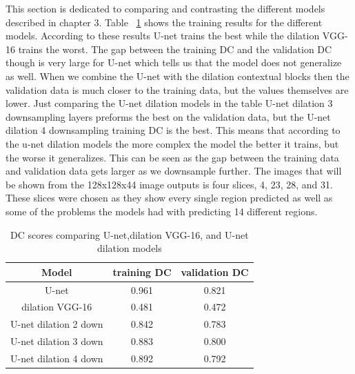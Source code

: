 This section is dedicated to comparing and contrasting the different models described in chapter 3.
Table ~\ref{tab.multi_model_results} shows the training results for the different models. 
According to these results U-net trains the best while the dilation VGG-16 trains the worst.
The gap between the training DC and the validation DC though is very large for U-net which tells us that the model does not generalize as well. 
When we combine the U-net with the dilation contextual blocks then the validation data is much closer to the training data, but the values themselves are lower. 
Just comparing the U-net dilation models in the table U-net dilation 3 downsampling layers preforms the best on the validation data, but the U-net dilation 4 downsampling training DC is the best.
This means that according to the u-net dilation models the more complex the model the better it trains, but the worse it generalizes.
This can be seen as the gap between the training data and validation data gets larger as we downsample further. 
The images that will be shown from the 128x128x44 image outputs is four slices, 4, 23, 28, and 31. These slices were chosen as they show every single region predicted as well as some of the problems the models had with predicting 14 different regions. 


\begin{table}[tbh]
\renewcommand{\arraystretch}{1}
\centering
\begin{tabular}{|c|c|c|}
\hline
\textbf{Model} & \textbf{training DC} & \textbf{validation DC}\\
\hline
U-net & 0.961 & 0.821\\ %
\hline
dilation VGG-16 & 0.481 & 0.472\\  
\hline
U-net dilation 2 down & 0.842 & 0.783\\  
\hline
U-net dilation 3 down & 0.883 & 0.800\\  
\hline
U-net dilation 4 down & 0.892 & 0.792\\  
\hline
\end{tabular}
\caption{DC scores comparing U-net,dilation VGG-16, and U-net dilation models}
\label{tab.multi_model_results}
\end{table}


